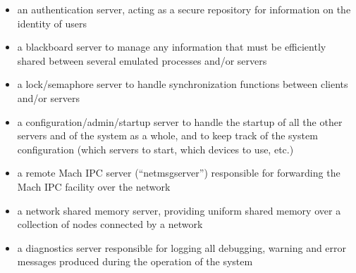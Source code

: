 \begin{description}
\begin{itemize}
\item an authentication server, acting as a secure repository for
information on the identity of users

\item a blackboard server to manage any information that must be
efficiently shared between several emulated processes and/or servers

\item a lock/semaphore server to handle synchronization functions
between clients and/or servers 

\item a configuration/admin/startup server to handle the startup of
all the other servers and of the system as a whole, and to keep track
of the system configuration (which servers to start, which devices to
use, etc.)

\item a remote Mach IPC server (``netmsgserver'') responsible for
forwarding the Mach IPC facility over the network

\item a network shared memory server, providing uniform shared memory
over a collection of nodes connected by a network

\item a diagnostics server responsible for logging all debugging,
warning and error messages produced during the operation of the system

\end{itemize}
\end{description}


